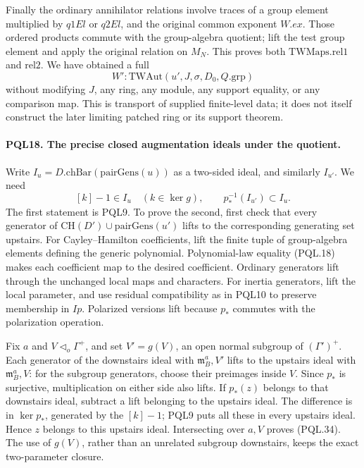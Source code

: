 Finally the ordinary annihilator relations involve
traces of a group element multiplied by \(q1El\)
or \(q2El\), and the original common exponent \(W.ex\).
Those ordered products commute with the group-algebra
quotient; lift the test group element and apply the
original relation on \(M_N\). This proves both
\(\mathrm{TWMaps.rel1}\) and \(\mathrm{rel2}\).
We have obtained a full
\[
 W':\mathrm{TWAut}(u',J,\sigma,D_0,Q.\mathrm{grp})
                                                            \tag{PQL.33}
\]
without modifying \(J\), any ring, any module, any
support equality, or any comparison map.
This is transport of supplied finite-level data; it
does not itself construct the later limiting patched
ring or its support theorem.

\paragraph{PQL18. The precise closed augmentation ideals under the quotient.}
\label{claim:PQL18}
Write \(I_u=D.\mathrm{chBar}(\mathrm{pairGens}(u))\)
as a two-sided ideal, and similarly \(I_{u'}\).
We need
\[
 [k]-1\in I_u\quad(k\in\ker g),\qquad
             p_*^{-1}(I_{u'})\subset I_u.            \tag{PQL.34}
\]
The first statement is PQL9. To prove the second, first
check that every generator of
\(\mathrm{CH}(D')\cup\mathrm{pairGens}(u')\)
lifts to the corresponding generating set upstairs.
For Cayley--Hamilton coefficients, lift the finite
tuple of group-algebra elements defining the generic
polynomial. Polynomial-law equality (PQL.18) makes
each coefficient map to the desired coefficient.
Ordinary generators lift through the unchanged local
maps and characters. For inertia generators, lift
the local parameter, and use residual compatibility
as in PQL10 to preserve membership in \(Ip\).
Polarized versions lift because \(p_*\) commutes
with the polarization operation.

Fix \(a\) and \(V\triangleleft_o\Gamma^+\), and set
\(V'=g(V)\), an open normal subgroup of \((\Gamma')^+\).
Each generator of the downstairs ideal with
\(\mathfrak m_B^a,V'\) lifts to the upstairs ideal
with \(\mathfrak m_B^a,V\): for the subgroup generators,
choose their preimages inside \(V\).
Since \(p_*\) is surjective, multiplication on either
side also lifts. If \(p_*(z)\) belongs to that downstairs
ideal, subtract a lift belonging to the upstairs
ideal. The difference is in \(\ker p_*\), generated
by the \([k]-1\); PQL9 puts all these in every
upstairs ideal. Hence \(z\) belongs to this upstairs
ideal. Intersecting over \(a,V\) proves (PQL.34).
The use of \(g(V)\), rather than an unrelated subgroup
downstairs, keeps the exact two-parameter closure.

